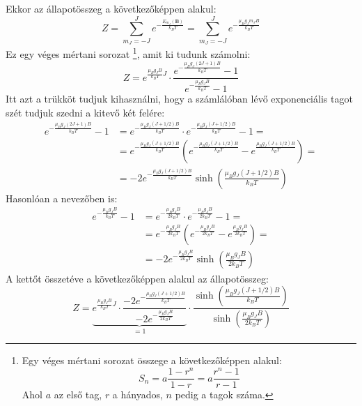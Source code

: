 \documentclass[../main.tex]{subfiles}
\begin{document}
Ekkor az állapotösszeg a következőképpen alakul:
\begin{equation}
    Z = \sum_{m_J = -J}^{J} e^{-\frac{E_{m_J}(\mathbf{B})}{k_B T}} = \sum_{m_J = -J}^{J} e^{-\frac{\mu_B g_J m_J B}{k_B T}}
\end{equation}
Ez egy véges mértani sorozat
\footnote{
    Egy véges mértani sorozat összege a következőképpen alakul:
    \begin{equation*}
        S_n = a \frac{1 - r^n}{1 - r} = a \frac{r^n - 1}{r - 1}
    \end{equation*}
    Ahol $a$ az első tag, $r$ a hányados, $n$ pedig a tagok száma.
}, amit ki tudunk számolni:
\begin{equation}
    Z = e^{\frac{\mu_B g_J B}{k_B T}J} \cdot \frac{e^{-\frac{\mu_B g_J (2J+1) B}{k_B T}} - 1}{e^{-\frac{\mu_B g_J B}{k_B T}} - 1}
\end{equation}
Itt azt a trükköt tudjuk kihasználni, hogy a számlálóban lévő exponenciális tagot szét tudjuk szedni a kitevő két felére:
\begin{equation}
    \begin{aligned}
        e^{-\frac{\mu_B g_J (2J+1) B}{k_B T}} - 1 &= e^{-\frac{\mu_B g_J (J+1/2) B}{k_B T}} \cdot e^{-\frac{\mu_B g_J (J+1/2) B}{k_B T}} - 1 = \\
        &= e^{-\frac{\mu_B g_J (J+1/2) B}{k_B T}} \left( e^{-\frac{\mu_B g_J (J+1/2) B}{k_B T}} - e^{\frac{\mu_B g_J (J+1/2) B}{k_B T}} \right) = \\
        &= - 2 e^{-\frac{\mu_B g_J (J+1/2) B}{k_B T}} \sinh \left( \frac{\mu_B g_J (J+1/2) B}{k_B T} \right)
    \end{aligned}
\end{equation}
Hasonlóan a nevezőben is:
\begin{equation}
    \begin{aligned}
        e^{-\frac{\mu_B g_J B}{k_B T}} - 1 &= e^{-\frac{\mu_B g_J B}{2 k_B T}} \cdot e^{-\frac{\mu_B g_J B}{2 k_B T}} - 1 = \\
        &= e^{-\frac{\mu_B g_J B}{2 k_B T}} \left( e^{-\frac{\mu_B g_J B}{2 k_B T}} - e^{\frac{\mu_B g_J B}{2 k_B T}} \right) = \\
        &= - 2 e^{-\frac{\mu_B g_J B}{2 k_B T}} \sinh \left( \frac{\mu_B g_J B}{2 k_B T} \right)
    \end{aligned}
\end{equation}
A kettőt összetéve a következőképpen alakul az állapotösszeg:
\begin{equation}
    Z = \underbrace{e^{\frac{\mu_B g_J B}{k_B T}J} \cdot \frac{- 2 e^{-\frac{\mu_B g_J (J+1/2) B}{k_B T}}}{- 2 e^{-\frac{\mu_B g_J B}{2 k_B T}}}}_{= 1} \cdot \frac{\sinh \left( \frac{\mu_B g_J (J+1/2) B}{k_B T} \right)}{\sinh \left( \frac{\mu_B g_J B}{2 k_B T} \right)}
\end{equation}
\end{document}
